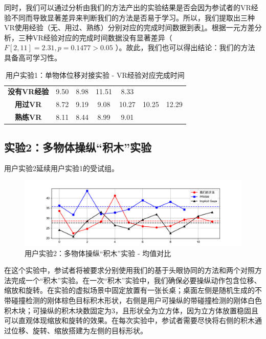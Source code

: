 同时，我们可以通过分析由我们的方法产出的实验结果是否会因为参试者的VR经验不同而导致显著差异来判断我们的方法是否易于学习。所以，我们提取出三种VR使用经验（无、用过、熟练）分别对应的完成时间数据到表\ref{table-4-4}。根据一元方差分析，三种VR经验对应的完成时间数据没有显著差异（ $F[2, 11] = 2.31, p = 0.1477 > 0.05$ ）。故此，我们也可以得出结论：我们的方法具备高可学习性。

\begin{table}[t!]
\centering
\begin{tabular}{ccccccc}
\textbf{没有VR经验} & 9.50 & 8.98 & 11.51 & 8.33  &       &       \\
\textbf{用过VR}   & 8.72 & 9.19 & 9.08  & 10.27 & 10.25 & 12.29 \\
\textbf{熟练VR}   & 8.11 & 8.44 & 8.99  & 9.01  &       &      
\end{tabular}
\caption{用户实验1：单物体位移对接实验 - VR经验对应完成时间}
\label{table-4-4}
\end{table}

\subsection{实验2：多物体操纵“积木”实验}

用户实验2延续用户实验1的受试组。

\begin{figure}[b!]
    \centering
    \includegraphics[width=\textwidth]{figure/user-study-2-avg.png}
    \caption{用户实验2：多物体操纵“积木”实验 - 均值对比}
    \label{fig-4-3}
\end{figure}

在这个实验中，参试者将被要求分别使用我们的基于头眼协同的方法和两个对照方法完成一个“积木”实验。在一次“积木”实验中，我们确保必要操纵动作包含位移、缩放和旋转。在实验的虚拟场景中固定放置有一张长桌；桌面左侧是随机生成的不带碰撞检测的刚体棕色目标积木形状，右侧是用户可操纵的带碰撞检测的刚体白色积木块；可操纵的积木块数固定为3，且形状全为立方体，因为立方体放置稳固且可以直观体现缩放和旋转的效果。在每次实验中，参试者需要尽快将右侧的积木通过位移、旋转、缩放搭建为左侧的目标形状。

